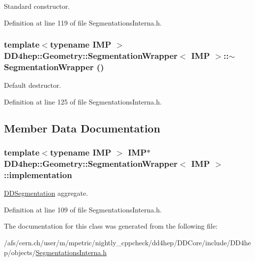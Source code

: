 Standard constructor. 

Definition at line 119 of file SegmentationsInterna.h.\hypertarget{class_d_d4hep_1_1_geometry_1_1_segmentation_wrapper_a0fe7f6d55cdf27640ee18c8606b659b2}{
\subsubsection[{$\sim$SegmentationWrapper}]{\setlength{\rightskip}{0pt plus 5cm}template$<$typename IMP $>$ {\bf DD4hep::Geometry::SegmentationWrapper}$<$ IMP $>$::$\sim${\bf SegmentationWrapper} ()}}
\label{class_d_d4hep_1_1_geometry_1_1_segmentation_wrapper_a0fe7f6d55cdf27640ee18c8606b659b2}


Default destructor. 

Definition at line 125 of file SegmentationsInterna.h.

\subsection{Member Data Documentation}
\hypertarget{class_d_d4hep_1_1_geometry_1_1_segmentation_wrapper_a1f5c880ae30f25a0dd16cfd963aea926}{
\subsubsection[{implementation}]{\setlength{\rightskip}{0pt plus 5cm}template$<$typename IMP $>$ IMP$\ast$ {\bf DD4hep::Geometry::SegmentationWrapper}$<$ IMP $>$::{\bf implementation}}}
\label{class_d_d4hep_1_1_geometry_1_1_segmentation_wrapper_a1f5c880ae30f25a0dd16cfd963aea926}


\hyperlink{namespace_d_d4hep_1_1_d_d_segmentation}{DDSegmentation} aggregate. 

Definition at line 109 of file SegmentationsInterna.h.

The documentation for this class was generated from the following file:\begin{DoxyCompactItemize}
\item 
/afs/cern.ch/user/m/mpetric/nightly\_\-cppcheck/dd4hep/DDCore/include/DD4hep/objects/\hyperlink{_segmentations_interna_8h}{SegmentationsInterna.h}\end{DoxyCompactItemize}
